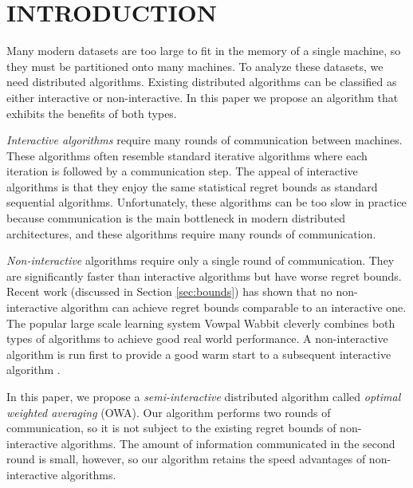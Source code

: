 \documentclass[twoside]{article}
\begin{document}



\section{INTRODUCTION}

Many modern datasets are too large to fit in the memory of a single machine,
so they must be partitioned onto many machines.
To analyze these datasets, we need distributed algorithms.
Existing distributed algorithms can be classified as either interactive or non-interactive.
In this paper we propose an algorithm that exhibits the benefits of both types.

\emph{Interactive algorithms} require many rounds of communication between machines.
These algorithms often resemble standard iterative algorithms where each iteration is followed by a communication step.
The appeal of interactive algorithms is that they enjoy the same statistical regret bounds as standard sequential algorithms.
Unfortunately, these algorithms can be too slow in practice because communication is the main bottleneck in modern distributed architectures,
and these algorithms require many rounds of communication.

\emph{Non-interactive} algorithms require only a single round of communication.
They are significantly faster than interactive algorithms
but have worse regret bounds.
Recent work (discussed in Section \ref{sec:bounds}) has shown that no non-interactive algorithm can achieve regret bounds comparable to an interactive one.
The popular large scale learning system Vowpal Wabbit cleverly combines both types of algorithms to achieve good real world performance.
A non-interactive algorithm is run first to provide a good warm start to a subsequent interactive algorithm \citep{vw,agarwal2014reliable}.

In this paper, we propose a \emph{semi-interactive} distributed algorithm called \emph{optimal weighted averaging} (OWA).
Our algorithm performs two rounds of communication,
so it is not subject to the existing regret bounds of non-interactive algorithms.
The amount of information communicated in the second round is small, however,
so our algorithm retains the speed advantages of non-interactive algorithms.
\end{document}

